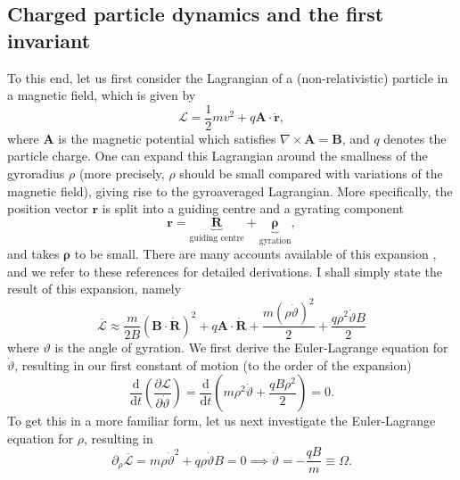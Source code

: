 \subsection{Charged particle dynamics and the first invariant}
To this end, let us first consider the Lagrangian of a (non-relativistic) particle in a magnetic field, which is given by \cite[Sec.~16]{landau2013classical}
\begin{equation}
    \mathcal{L} = \frac{1}{2} m v^2 + q\boldsymbol{A} \cdot \dot{\boldsymbol{r}},
\end{equation}
where $\boldsymbol{A}$ is the magnetic potential which satisfies $\nabla \times \boldsymbol{A} = \boldsymbol{B}$, and $q$ denotes the particle charge. One can expand this Lagrangian around the smallness of the gyroradius $\rho$ (more precisely, $\rho$ should be small compared with variations of the magnetic field), giving rise to the gyroaveraged Lagrangian. More specifically, the position vector $\boldsymbol{r}$ is split into a guiding centre and a gyrating component
\begin{equation}
    \boldsymbol{r} = \underbrace{\boldsymbol{R}}_{\text{guiding centre}} + \underbrace{\boldsymbol{\rho}}_{\text{gyration}},
\end{equation}
and takes $\boldsymbol{\rho}$ to be small. There are many accounts available of this expansion \cite{littlejohn1983variational,helander2005collisional,cary2009hamiltonian,rodriguez2022quasisymmetry}, and we refer to these references for detailed derivations. I shall simply state the result of this expansion, namely
\begin{equation}
    \overline{\mathcal{L}} \approx \frac{m}{2B}\left( \boldsymbol{B} \cdot \dot{\boldsymbol{R}} \right)^2 + q \boldsymbol{A} \cdot \dot{\boldsymbol{R}} + \frac{m(\rho \dot{\vartheta})^2}{2} + \frac{q \rho^2 \dot{\vartheta} B}{2}
\end{equation}
where $\vartheta$ is the angle of gyration. We first derive the Euler-Lagrange equation for $\dot{\vartheta}$, resulting in our first constant of motion (to the order of the expansion)
\begin{equation}
    \frac{\mathrm{d}}{\mathrm{d} t} \left( \frac{\partial \mathcal{L}}{\partial \dot{\vartheta}} \right) = \frac{\mathrm{d}}{\mathrm{d} t} \left( m \rho^2 \dot{\vartheta} + \frac{q B \rho^2}{2} \right) = 0.
    \label{eq: mu-cons general}
\end{equation}
To get this in a more familiar form, let us next investigate the Euler-Lagrange equation for $\rho$, resulting in
\begin{equation}
    \partial_\rho \overline{\mathcal{L}} = m \rho \dot{\vartheta}^2 + q \rho \dot{\vartheta} B = 0 \implies \dot{\vartheta} = -\frac{qB}{m} \equiv \Omega.
\end{equation}
